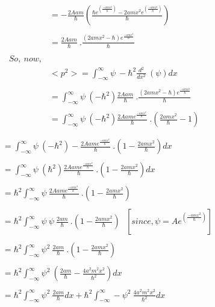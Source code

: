 \documentclass{article}
\begin{document}
\begin{homeworkProblem}
\begin{align*}
   &=-\frac{2 Aam}{\hbar}(\frac{\hbar e^{( \frac{-amx^{2}}{\hbar})} -{2amx^{2} e^{( \frac{-amx^{2}}{\hbar})}}}{\hbar}) \\\\
   &=\frac{2 Aam}{\hbar}\ . {\frac{(2amx^{2}-\hbar)e^{\frac{-amx^{2}}{\hbar}}}{\hbar}}\\\\
   So, \ now,\\
   &<p^{2}> =\int_{-\infty}^{\infty}\psi \ -\hbar^{2}\frac{d^{2}}{dx^{2}}\ (\psi) dx \\\\
   &=\int_{-\infty}^{\infty}\psi \ (-\hbar^{2}) \frac{2 Aam}{\hbar}\ . {\frac{(2amx^{2}-\hbar)e^{\frac{-amx^{2}}{\hbar}}}{\hbar}}\\\\
   &=\int_{-\infty}^{\infty}\psi \ (-\hbar^{2}) \frac{2 Aame^{\frac{-amx^{2}}{\hbar}}}{\hbar}\ . (\frac{2amx^{2}}{\hbar} -1)\\\\
\end{align*}
\newpage\vspace{5mm}
\hspace{20mm}
\large
\begin{align*}
  &=\int_{-\infty}^{\infty}\psi \ (-\hbar^{2}) -\frac{2 Aame^{\frac{-amx^{2}}{\hbar}}}{\hbar}\ . (1-\frac{2amx^{2}}{\hbar})dx\\\\
  &=\int_{-\infty}^{\infty}\psi \ (\hbar^{2}) \frac{2 Aame^{\frac{-amx^{2}}{\hbar}}}{\hbar}\ . (1-\frac{2amx^{2}}{\hbar}) dx\\\\
  &=\hbar^{2}\int_{-\infty}^{\infty}\psi \  \frac{2 Aame^{\frac{-amx^{2}}{\hbar}}}{\hbar}\ . (1-\frac{2amx^{2}}{\hbar})\\\\
  &=\hbar^{2}\int_{-\infty}^{\infty}\psi \ \psi \ \frac{2 am}{\hbar}\ . (1-\frac{2amx^{2}}{\hbar})\ \ \ [since, \psi =A e^{( \frac{-amx^{2}}{\hbar})}]\\\\
  &=\hbar^{2}\int_{-\infty}^{\infty}\psi^{2}  \ \frac{2 am}{\hbar}\ . (1-\frac{2amx^{2}}{\hbar})\\\\
  &=\hbar^{2}\int_{-\infty}^{\infty}\psi^{2}  \ ( \frac{2 am}{\hbar} -\frac{4a^{2}m^{2}x^{2}}{\hbar^{2}}) dx\\\\
  &= \hbar^{2}\int_{-\infty}^{\infty}\psi^{2}  \  \frac{2 am}{\hbar} dx +\hbar^{2}\int_{-\infty}^{\infty}-\psi^{2}  \ \frac{4a^{2}m^{2}x^{2}}{\hbar^{2}} dx \\\\

\end{align*}
\end{homeworkProblem}
\end{document}
